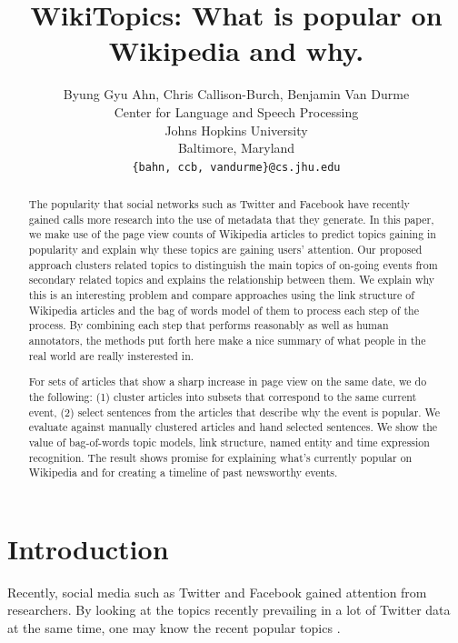 \documentclass[11pt]{article}
\title{WikiTopics: What is popular on Wikipedia and why.}
\author{Byung Gyu Ahn, Chris Callison-Burch, Benjamin Van Durme \\
  Center for Language and Speech Processing \\
  Johns Hopkins University \\
  Baltimore, Maryland \\
  {\tt \{bahn, ccb, vandurme\}@cs.jhu.edu} \\}
\date{}
\begin{document}
\maketitle
\begin{abstract}
The popularity that social networks such as Twitter and Facebook have recently gained calls more research into the use of metadata that they generate. In this paper, we make use of the page view counts of Wikipedia articles to predict topics gaining in popularity and explain why these topics are gaining users' attention. Our proposed approach clusters related topics to distinguish the main topics of on-going events from secondary related topics and explains the relationship between them. We explain why this is an interesting problem and compare approaches using the link structure of Wikipedia articles and the bag of words model of them to process each step of the process. By combining each step that performs reasonably as well as human annotators, the methods put forth here make a nice summary of what people in the real world are really insterested in.

For sets of articles that show a sharp increase in page view on the same date, we do the following:
(1) cluster articles into subsets that correspond to the same current event, (2) select sentences from the articles that describe why the event is popular.
We evaluate against manually clustered articles and hand selected sentences.
We show the value of bag-of-words topic models, link structure, named entity and time expression recognition.
The result shows promise for explaining what's currently popular on Wikipedia and for creating a timeline of past newsworthy events.

\end{abstract}

\section{Introduction}

Recently, social media such as Twitter and Facebook gained attention from researchers.
By looking at the topics recently prevailing in a lot of Twitter data at the same time, one may know the recent popular topics \cite{petrovic10}.

\end{document}
